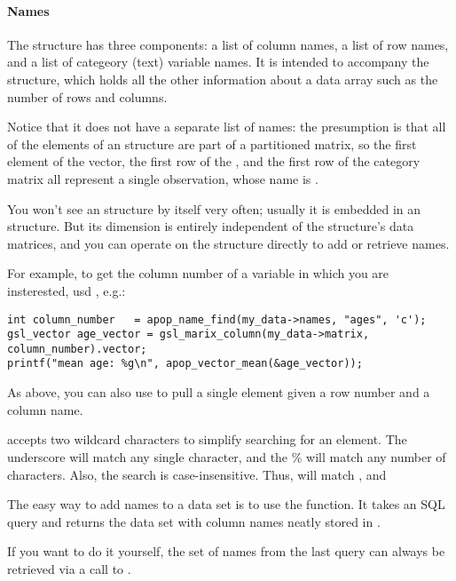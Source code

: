 \paragraph{Names}
The  structure has three components: a list of column
names, a list of row names, and a list of categeory (text) variable
names. It is intended to accompany the  structure,
which holds all the other information about a data array such as the
number of rows and columns. 

Notice that it does not have a separate list of names: the presumption
is that all of the elements of an  structure are part
of a partitioned matrix, so the first element of the vector, the first
row of the , and the first row of the category matrix all represent a single observation, whose name is .

You won't see an  structure by itself very often;
usually it is embedded in an  structure. But its
dimension is entirely independent of the  structure's
data matrices, and you can operate on the  structure
directly to add or retrieve names.

For example, to get the
column number of a variable in which you are insterested, usd , e.g.:
\begin{lstlisting}
int column_number   = apop_name_find(my_data->names, "ages", 'c');
gsl_vector age_vector = gsl_marix_column(my_data->matrix, column_number).vector;
printf("mean age: %g\n", apop_vector_mean(&age_vector));
\end{lstlisting}
As above, you can also use  to pull a single
element given a row number and a column name.

 accepts two wildcard characters to simplify
searching for an element. The underscore will match any single
character, and the \% will match any number of characters. Also, the
search is case-insensitive. Thus,  will match
,  and 

The easy way to add names to a data set is to use the 
 function. It takes an SQL query and returns
the data set with column names neatly stored in
.

If you want to do it yourself, the set of names from the last query can
always be retrieved via a call to .

